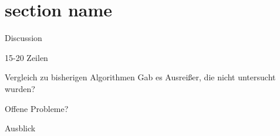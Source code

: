\section{section name}
{Discussion}
\label{sec:discussion}

15-20 Zeilen

Vergleich zu bisherigen Algorithmen
Gab es Ausreißer, die nicht untersucht wurden?

Offene Probleme?

Ausblick
